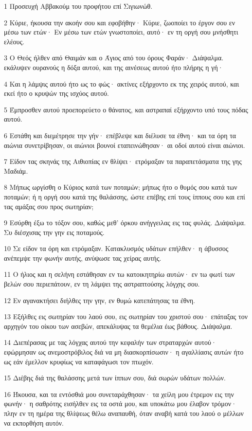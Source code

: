 \par 1 Προσευχή Αββακούμ του προφήτου επί Σιγιωνώθ.
\par 2 Κύριε, ήκουσα την ακοήν σου και εφοβήθην· Κύριε, ζωοποίει το έργον σου εν μέσω των ετών· Εν μέσω των ετών γνωστοποίει, αυτό· εν τη οργή σου μνήσθητι ελέους.
\par 3 Ο Θεός ήλθεν από Θαιμάν και ο Άγιος από του όρους Φαράν· Διάψαλμα. εκάλυψεν ουρανούς η δόξα αυτού, και της αινέσεως αυτού ήτο πλήρης η γή·
\par 4 Και η λάμψις αυτού ήτο ως το φώς· ακτίνες εξήρχοντο εκ της χειρός αυτού, και εκεί ήτο ο κρυψών της ισχύος αυτού.
\par 5 Έμπροσθεν αυτού προεπορεύετο ο θάνατος, και αστραπαί εξήρχοντο υπό τους πόδας αυτού.
\par 6 Εστάθη και διεμέτρησε την γήν· επέβλεψε και διέλυσε τα έθνη· και τα όρη τα αιώνια συνετρίβησαν, οι αιώνιοι βουνοί εταπεινώθησαν· αι οδοί αυτού είναι αιώνιοι.
\par 7 Είδον τας σκηνάς της Αιθιοπίας εν θλίψει· ετρόμαξαν τα παραπετάσματα της γης Μαδιάμ.
\par 8 Μήπως ωργίσθη ο Κύριος κατά των ποταμών; μήπως ήτο ο θυμός σου κατά των ποταμών; ή η οργή σου κατά της θαλάσσης, ώστε επέβης επί τους ίππους σου και επί τας αμάξας σου προς σωτηρίαν;
\par 9 Εσύρθη έξω το τόξον σου, καθώς μεθ' όρκου ανήγγειλας εις τας φυλάς. Διάψαλμα. Συ διέσχισας την γην εις ποταμούς.
\par 10 Σε είδον τα όρη και ετρόμαξαν. Κατακλυσμός υδάτων επήλθεν· η άβυσσος ανέπεμψε την φωνήν αυτής, ανύψωσε τας χείρας αυτής.
\par 11 Ο ήλιος και η σελήνη εστάθησαν εν τω κατοικητηρίω αυτών· εν τω φωτί των βελών σου περιεπάτουν, εν τη λάμψει της αστραπτούσης λόγχης σου.
\par 12 Εν αγανακτήσει διήλθες την γην, εν θυμώ κατεπάτησας τα έθνη.
\par 13 Εξήλθες εις σωτηρίαν του λαού σου, εις σωτηρίαν του χριστού σου· επάταξας τον αρχηγόν του οίκου των ασεβών, απεκάλυψας τα θεμέλια έως βάθους. Διάψαλμα.
\par 14 Διεπέρασας με τας λόγχας αυτού την κεφαλήν των στραταρχών αυτού· εφώρμησαν ως ανεμοστρόβιλος διά να μη διασκορπίσωσιν· η αγαλλίασις αυτών ήτο ως εάν έμελλον κρυφίως να καταφάγωσι τον πτωχόν.
\par 15 Διέβης διά της θαλάσσης μετά των ίππων σου, διά σωρών υδάτων πολλών.
\par 16 Ήκουσα, και τα εντόσθιά μου συνεταράχθησαν· τα χείλη μου έτρεμον εις την φωνήν· η σαθρότης εισήλθεν εις τα οστά μου, και υποκάτω μου έλαβον τρόμον· πλην εν τη ημέρα της θλίψεως θέλω αναπαυθή, όταν αναβή κατά του λαού ο μέλλων να εκπορθήση αυτόν.

